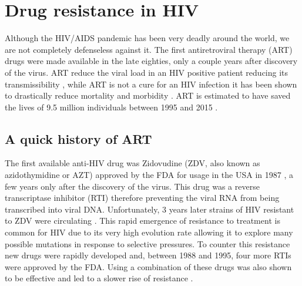 \documentclass[
  11pt,
  twoside]{scrbook}
\begin{document}
\hypertarget{drug-resistance-in-hiv}{%
\section{Drug resistance in HIV}\label{drug-resistance-in-hiv}}

Although the HIV/AIDS pandemic has been very deadly around the world, we are not completely defenseless against it. The first antiretroviral therapy (ART) drugs were made available in the late eighties, only a couple years after discovery of the virus. ART reduce the viral load in an HIV positive patient reducing its transmissibility \autocite{eisingerHIVViralLoad2019}, while ART is not a cure for an HIV infection it has been shown to drastically reduce mortality and morbidity \autocite{palellaDecliningMorbidityMortality1998}. ART is estimated to have saved the lives of 9.5 million individuals between 1995 and 2015 \autocite{forsytheTwentyYearsAntiretroviral2019}.

\hypertarget{a-quick-history-of-art}{%
\subsection{A quick history of ART}\label{a-quick-history-of-art}}

The first available anti-HIV drug was Zidovudine (ZDV, also known as azidothymidine or AZT) approved by the FDA for usage in the USA in 1987 \autocite{fischlEfficacyAzidothymidineAZT1987}, a few years only after the discovery of the virus. This drug was a reverse transcriptase inhibitor (RTI) therefore preventing the viral RNA from being transcribed into viral DNA. Unfortunately, 3 years later strains of HIV resistant to ZDV were circulating \autocite{richmanSusceptibilityNucleosideAnalogues1990}. This rapid emergence of resistance to treatment is common for HIV \autocite{yeoDeterminationHIV1RT2020} due to its very high evolution rate \autocite{cuevasExtremelyHighMutation2015} allowing it to explore many possible mutations in response to selective pressures. To counter this resistance new drugs were rapidly developed and, between 1988 and 1995, four more RTIs were approved by the FDA. Using a combination of these drugs was also shown to be effective and led to a slower rise of resistance \autocite{gulickTreatmentIndinavirZidovudine1997}.
\end{document}
